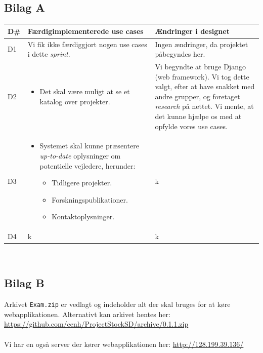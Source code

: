\documentclass[12pt]{article}
\begin{document}
\subsection{Bilag A}
\label{sec:bilagA}
\begin{center}
	\begin{tabular}{|p{}|p{}|p{}|}
		\hline
	\textbf{D\#} & \textbf{Færdigimplementerede use cases} & \textbf{Ændringer i designet} \\ \hline

	D1 & Vi fik ikke færdiggjort nogen use cases i dette \textit{sprint}. & Ingen ændringer, da projektet påbegyndes her. \\ \hline

	D2 & 		\begin{minipage}[t]{0.4\textwidth}
	\begin{itemize}
		\item Det skal være muligt at se et katalog over projekter.
		\end{itemize}
		\end{minipage} & Vi begyndte at bruge Django (web framework). Vi tog dette valgt, efter at have snakket med andre grupper, og foretaget \textit{research} på nettet. Vi mente, at det kunne hjælpe os med at opfylde vores use cases. \\ \hline

	D3 &
	\begin{minipage}[t]{0.4\textwidth}
	\begin{itemize}
		\item Systemet skal kunne præsentere \textit{up-to-date} oplysninger om potentielle vejledere, herunder:
		\begin{itemize}
			\item Tidligere projekter.
			\item Forskningspublikationer.
			\item Kontaktoplysninger.
		\end{itemize}
	\end{itemize}
	\end{minipage} & k \\
		\hline
	D4 & k & k \\ \hline
	\end{tabular}
\end{center}~\\

\subsection{Bilag B}
\label{sec:bilagB}
Arkivet \texttt{Exam.zip} er vedlagt og indeholder alt der skal bruges for at køre webapplikationen.
Alternativt kan arkivet hentes her:\\
\url{https://github.com/cenh/ProjectStockSD/archive/0.1.1.zip}\\
\\
Vi har en også server der kører webapplikationen her: \url{http://128.199.39.136/}
\end{document}
